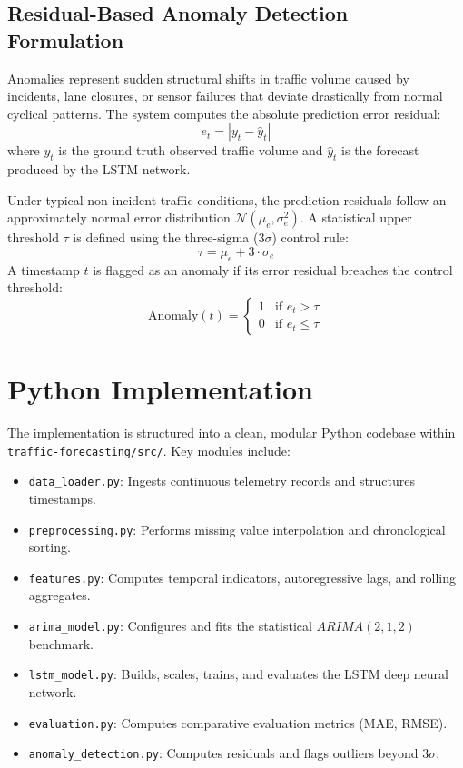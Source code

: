 \documentclass[12pt,a4paper]{article}
\begin{document}
\subsection{Residual-Based Anomaly Detection Formulation}
Anomalies represent sudden structural shifts in traffic volume caused by incidents, lane closures, or sensor failures that deviate drastically from normal cyclical patterns. The system computes the absolute prediction error residual:
\begin{equation}
    e_t = |y_t - \hat{y}_t|
\end{equation}
where $y_t$ is the ground truth observed traffic volume and $\hat{y}_t$ is the forecast produced by the LSTM network.

Under typical non-incident traffic conditions, the prediction residuals follow an approximately normal error distribution $\mathcal{N}(\mu_e, \sigma_e^2)$. A statistical upper threshold $\tau$ is defined using the three-sigma ($3\sigma$) control rule:
\begin{equation}
    \tau = \mu_e + 3 \cdot \sigma_e
\end{equation}
A timestamp $t$ is flagged as an anomaly if its error residual breaches the control threshold:
\begin{equation}
    \text{Anomaly}(t) = \begin{cases} 1 & \text{if } e_t > \tau \\ 0 & \text{if } e_t \le \tau \end{cases}
\end{equation}

\section{Python Implementation}
The implementation is structured into a clean, modular Python codebase within \texttt{traffic-forecasting/src/}. Key modules include:
\begin{itemize}
    \item \texttt{data\_loader.py}: Ingests continuous telemetry records and structures timestamps.
    \item \texttt{preprocessing.py}: Performs missing value interpolation and chronological sorting.
    \item \texttt{features.py}: Computes temporal indicators, autoregressive lags, and rolling aggregates.
    \item \texttt{arima\_model.py}: Configures and fits the statistical $ARIMA(2,1,2)$ benchmark.
    \item \texttt{lstm\_model.py}: Builds, scales, trains, and evaluates the LSTM deep neural network.
    \item \texttt{evaluation.py}: Computes comparative evaluation metrics (MAE, RMSE).
    \item \texttt{anomaly\_detection.py}: Computes residuals and flags outliers beyond $3\sigma$.
\end{itemize}
\end{document}
